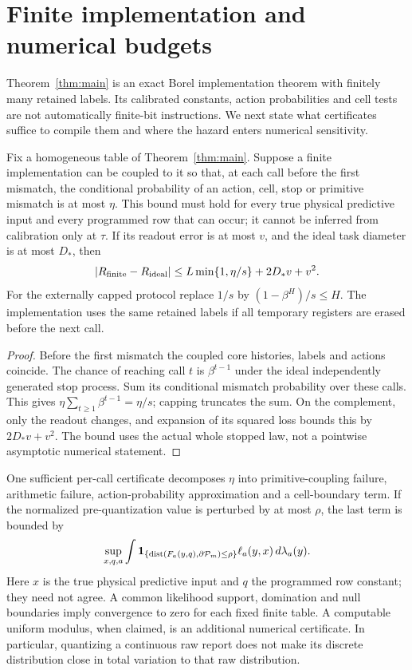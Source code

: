 \section{Finite implementation and numerical budgets}\label{sec:implementation}
Theorem~\ref{thm:main} is an exact Borel implementation theorem with finitely many retained labels. Its calibrated constants, action probabilities and cell tests are not automatically finite-bit instructions. We next state what certificates suffice to compile them and where the hazard enters numerical sensitivity.

\begin{proposition}\label{prop:numerical}
Fix a homogeneous table of Theorem~\ref{thm:main}. Suppose a finite implementation can be coupled to it so that, at each call before the first mismatch, the conditional probability of an action, cell, stop or primitive mismatch is at most $\eta$. This bound must hold for every true physical predictive input and every programmed row that can occur; it cannot be inferred from calibration only at $\tau$. If its readout error is at most $v$, and the ideal task diameter is at most $D_*$, then
\begin{equation}\label{eq:numerical}
 |R_{\rm finite}-R_{\rm ideal}|
 \le L\min\{1,\eta/s\}+2D_*v+v^2.
\end{equation}
For the externally capped protocol replace $1/s$ by $(1-\beta^H)/s\le H$. The implementation uses the same retained labels if all temporary registers are erased before the next call.
\end{proposition}
\begin{proof}
Before the first mismatch the coupled core histories, labels and actions coincide. The chance of reaching call $t$ is $\beta^{t-1}$ under the ideal independently generated stop process. Sum its conditional mismatch probability over these calls. This gives $\eta\sum_{t\ge1}\beta^{t-1}=\eta/s$; capping truncates the sum. On the complement, only the readout changes, and expansion of its squared loss bounds this by $2D_*v+v^2$. The bound uses the actual whole stopped law, not a pointwise asymptotic numerical statement.
\end{proof}

One sufficient per-call certificate decomposes $\eta$ into primitive-coupling failure, arithmetic failure, action-probability approximation and a cell-boundary term. If the normalized pre-quantization value is perturbed by at most $\rho$, the last term is bounded by
\begin{equation}\label{eq:boundary-mass}
 \sup_{x,q,a}\int\mathbf 1_{\{\operatorname{dist}(F_a(y,q),\partial\mathcal P_m)\le\rho\}}
                     \ell_a(y,x)\,d\lambda_a(y).
\end{equation}
Here $x$ is the true physical predictive input and $q$ the programmed row constant; they need not agree. A common likelihood support, domination and null boundaries imply convergence to zero for each fixed finite table. A computable uniform modulus, when claimed, is an additional numerical certificate. In particular, quantizing a continuous raw report does not make its discrete distribution close in total variation to that raw distribution.

